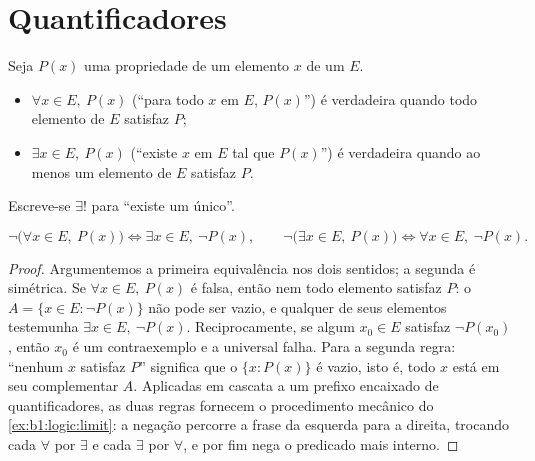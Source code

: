 \section{Quantificadores}

\begin{definition}[Quantificadores]\label{def:b1:logic:quantifiers}
Seja $P(x)$ uma propriedade de um elemento $x$ de um  $E$.
\begin{itemize}
  \item $\forall x \in E,\ P(x)$ (``para todo $x$ em $E$, $P(x)$'') é
        verdadeira quando todo elemento de $E$ satisfaz $P$;
  \item $\exists x \in E,\ P(x)$ (``existe $x$ em $E$ tal que
        $P(x)$'') é verdadeira quando ao menos um elemento de $E$ satisfaz
        $P$.
\end{itemize}
Escreve-se $\exists!$ para ``existe um único''.
\end{definition}

\begin{proposition}\label{prop:b1:logic:negquant}
\[
\lnot\bigl(\forall x \in E,\ P(x)\bigr) \iff
\exists x \in E,\ \lnot P(x),
\qquad
\lnot\bigl(\exists x \in E,\ P(x)\bigr) \iff
\forall x \in E,\ \lnot P(x).
\]
\end{proposition}

\begin{proof}
Argumentemos a primeira equivalência nos dois sentidos; a segunda
é simétrica. Se $\forall x \in E,\ P(x)$ é falsa, então nem todo
elemento satisfaz $P$: o  $A = \{x \in E : \lnot P(x)\}$
não pode ser vazio, e qualquer de seus elementos testemunha $\exists x \in
E,\ \lnot P(x)$. Reciprocamente, se algum $x_0 \in E$ satisfaz $\lnot
P(x_0)$, então $x_0$ é um contraexemplo e a  universal
falha. Para a segunda regra: ``nenhum $x$ satisfaz $P$'' significa que o
 $\{x : P(x)\}$ é vazio, isto é, todo $x$ está em seu complementar
$A$. Aplicadas em cascata a um prefixo encaixado de quantificadores, as
duas regras fornecem o procedimento mecânico do \cref{ex:b1:logic:limit}:
a negação percorre a frase da esquerda para a direita, trocando cada
$\forall$ por $\exists$ e cada $\exists$ por $\forall$, e por fim nega
o predicado mais interno.
\end{proof}

